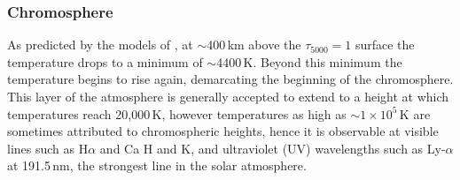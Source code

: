 \subsubsection{Chromosphere}\label{sec:122}

As predicted by the models of \citet{vernazza1981, fontenla1988, gabriel1976}, at $\sim$400\,km above the $\tau_{5000}=1$ surface the temperature drops to a minimum of $\sim$4400\,K. Beyond this minimum the temperature begins to rise again, demarcating the beginning of the chromosphere. This layer of the atmosphere is generally accepted to extend to a height at which temperatures reach 20,000\,K, however temperatures as high as $\sim$$1\times10^5$\,K are sometimes attributed to chromospheric heights, hence it is observable at visible lines such as H$\alpha$ and Ca H and K, and ultraviolet (UV) wavelengths such as Ly-$\alpha$ at 191.5\,nm, the strongest line in the solar atmosphere. 


